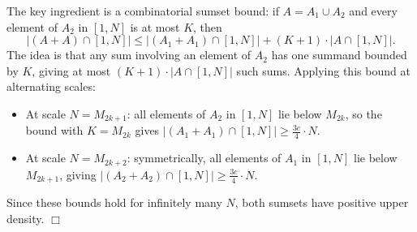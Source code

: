     The key ingredient is a combinatorial sumset bound: if $A = A_1 \cup A_2$ and every element of $A_2$ in $[1,N]$ is at most $K$, then
    $$|(A+A) \cap [1,N]| \le |(A_1+A_1) \cap [1,N]| + (K+1) \cdot |A \cap [1,N]|.$$
    The idea is that any sum involving an element of $A_2$ has one summand bounded by $K$, giving at most $(K+1) \cdot |A \cap [1,N]|$ such sums. Applying this bound at alternating scales:
    \begin{itemize}
        \item At scale $N = M_{2k+1}$: all elements of $A_2$ in $[1,N]$ lie below $M_{2k}$, so the bound with $K = M_{2k}$ gives $|(A_1+A_1) \cap [1,N]| \ge \frac{3c}{4} \cdot N$.
        \item At scale $N = M_{2k+2}$: symmetrically, all elements of $A_1$ in $[1,N]$ lie below $M_{2k+1}$, giving $|(A_2+A_2) \cap [1,N]| \ge \frac{3c}{4} \cdot N$.
    \end{itemize}
    Since these bounds hold for infinitely many $N$, both sumsets have positive upper density. \hfill $\Box$